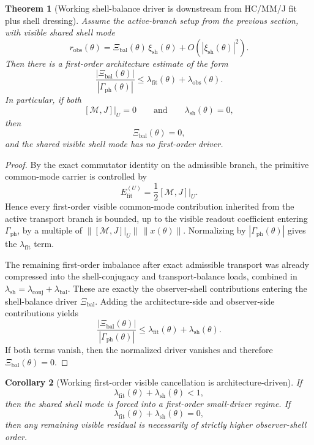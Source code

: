 \documentclass[12pt,a4paper]{article}
\newtheorem{theorem}{Theorem}[section]
\newtheorem{corollary}[theorem]{Corollary}
\begin{document}
\begin{theorem}[Working shell-balance driver is downstream from HC/MM/J fit plus shell dressing]
Assume the active-branch setup from the previous section, with visible shared shell mode
\[
 r_{\mathrm{obs}}(\theta)
 =
 \Xi_{\mathrm{bal}}(\theta)\,\xi_{\mathrm{sh}}(\theta)
 + O\!\left(|\xi_{\mathrm{sh}}(\theta)|^2\right).
\]
Then there is a first-order architecture estimate of the form
\[
 \frac{|\Xi_{\mathrm{bal}}(\theta)|}{|\Gamma_{\mathrm{ph}}(\theta)|}
 \le
 \lambda_{\mathrm{fit}}(\theta)+\lambda_{\mathrm{obs}}(\theta).
\]
In particular, if both
\[
 [\mathcal M,J]\big|_{U}=0
 \qquad\text{and}\qquad
 \lambda_{\mathrm{sh}}(\theta)=0,
\]
then
\[
 \Xi_{\mathrm{bal}}(\theta)=0,
\]
and the shared visible shell mode has no first-order driver.
\end{theorem}

\begin{proof}
By the exact commutator identity on the admissible branch, the primitive
common-mode carrier is controlled by
\[
 E_{\mathrm{fit}}^{(U)}
 = \frac12[\mathcal M,J]\big|_{U}.
\]
Hence every first-order visible common-mode contribution inherited from the
active transport branch is bounded, up to the visible readout coefficient
entering \(\Gamma_{\mathrm{ph}}\), by a multiple of
\(\|[\mathcal M,J]|_{U}\|\,\|x(\theta)\|\). Normalizing by
\(|\Gamma_{\mathrm{ph}}(\theta)|\) gives the \(\lambda_{\mathrm{fit}}\) term.

The remaining first-order imbalance after exact admissible transport was already compressed into the shell-conjugacy and transport-balance loads, combined in \(\lambda_{\mathrm{sh}}=\lambda_{\mathrm{conj}}+\lambda_{\mathrm{bal}}\). These are exactly the observer-shell contributions entering the shell-balance driver \(\Xi_{\mathrm{bal}}\). Adding the architecture-side and observer-side contributions yields
\[
 \frac{|\Xi_{\mathrm{bal}}(\theta)|}{|\Gamma_{\mathrm{ph}}(\theta)|}
 \le
 \lambda_{\mathrm{fit}}(\theta)+\lambda_{\mathrm{sh}}(\theta).
\]
If both terms vanish, then the normalized driver vanishes and therefore \(\Xi_{\mathrm{bal}}(\theta)=0\).
\end{proof}

\begin{corollary}[Working first-order visible cancellation is architecture-driven]
If
\[
 \lambda_{\mathrm{fit}}(\theta)+\lambda_{\mathrm{sh}}(\theta)<1,
\]
then the shared shell mode is forced into a first-order small-driver regime. If
\[
 \lambda_{\mathrm{fit}}(\theta)+\lambda_{\mathrm{sh}}(\theta)=0,
\]
then any remaining visible residual is necessarily of strictly higher observer-shell order.
\end{corollary}
\end{document}
